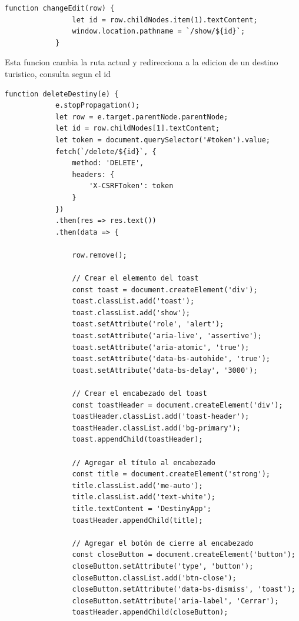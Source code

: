 \documentclass{article}
\begin{document}
        \begin{lstlisting}[caption={script changeEdit}, label={codigo-scripts}]
            function changeEdit(row) {
                let id = row.childNodes.item(1).textContent;
                window.location.pathname = `/show/${id}`;
            }
        \end{lstlisting}

        Esta funcion cambia la ruta actual y redirecciona a la edicion de un destino turistico, consulta segun el id

        \begin{lstlisting}[caption={script delete}, label={codigo-scripts}]
        function deleteDestiny(e) {
            e.stopPropagation();
            let row = e.target.parentNode.parentNode;
            let id = row.childNodes[1].textContent;
            let token = document.querySelector('#token').value;
            fetch(`/delete/${id}`, { 
                method: 'DELETE',
                headers: {
                    'X-CSRFToken': token
                }
            })
            .then(res => res.text())
            .then(data => {
        
                row.remove();
        
                // Crear el elemento del toast
                const toast = document.createElement('div');
                toast.classList.add('toast');
                toast.classList.add('show');
                toast.setAttribute('role', 'alert');
                toast.setAttribute('aria-live', 'assertive');
                toast.setAttribute('aria-atomic', 'true');
                toast.setAttribute('data-bs-autohide', 'true');
                toast.setAttribute('data-bs-delay', '3000');
        
                // Crear el encabezado del toast
                const toastHeader = document.createElement('div');
                toastHeader.classList.add('toast-header');
                toastHeader.classList.add('bg-primary');
                toast.appendChild(toastHeader);
        
                // Agregar el título al encabezado
                const title = document.createElement('strong');
                title.classList.add('me-auto');
                title.classList.add('text-white');
                title.textContent = 'DestinyApp';
                toastHeader.appendChild(title);
        
                // Agregar el botón de cierre al encabezado
                const closeButton = document.createElement('button');
                closeButton.setAttribute('type', 'button');
                closeButton.classList.add('btn-close');
                closeButton.setAttribute('data-bs-dismiss', 'toast');
                closeButton.setAttribute('aria-label', 'Cerrar');
                toastHeader.appendChild(closeButton);
        

\end{lstlisting}
\end{document}
